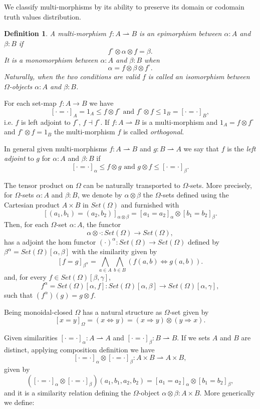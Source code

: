 \documentclass[oribibl]{llncs}
\newtheorem{defn}{Definition}
\begin{document}
We classify multi-morphisms by its ability to preserve its domain or codomain truth values distribution.

\begin{defn}\label{def:isomorphism}
A multi-morphism $f:A\rightharpoonup B$ is an \emph{epimorphism} between $\alpha:A$ and $\beta:B$ if
\[f^\circ\otimes\alpha\otimes f=\beta.\]
It is a \emph{monomorphism} between $\alpha:A$ and $\beta:B$ when
\[\alpha =f\otimes\beta\otimes f^\circ.\]
Naturally, when the two conditions are valid $f$ is called an \emph{isomorphism} between $\Omega$-objects $\alpha:A$ and $\beta:B$.
\end{defn}

For each set-map $f:A\rightarrow B$ we have
\[
[\cdot=\cdot]_A=1_A\leq f\otimes f^\circ \text{ and } f^\circ\otimes f\leq 1_B=[\cdot=\cdot]_B, \]
i.e. $f$ is left adjoint to $f^\circ$, $f\dashv f^\circ$. If $f:A\rightharpoonup B$ is a multi-morphism and $1_A = f\otimes f^\circ$ and $f^\circ\otimes f= 1_B$ the multi-morphism $f$ is called \emph{orthogonal}.

In general given multi-morphisms
$f:A\rightharpoonup B$ and $g:B\rightharpoonup A$ we say that $f$ is the \emph{left adjoint} to $g$ for $\alpha:A$ and $\beta:B$ if
\[
[\cdot=\cdot]_\alpha\leq f\otimes g \text{ and } g\otimes f\leq [\cdot=\cdot]_\beta.\]

The tensor product on $\Omega$ can be naturally transported to $\Omega$-sets. More precisely, for $\Omega$-sets $\alpha:A$ and $\beta:B$, we denote by $\alpha\otimes \beta$ the $\Omega$-sets defined using the Cartesian product $A\times B$ in $Set(\Omega)$ and furnished with
\[
[(a_1,b_1)=(a_2,b_2)]_{\alpha\otimes \beta}=[a_1=a_2]_\alpha\otimes[b_1=b_2]_\beta.
\]
Then, for each $\Omega$-set $\alpha:A$, the functor
\[
\alpha\otimes\cdot:Set(\Omega)\rightarrow Set(\Omega),
\]
has a adjoint the hom functor $(\cdot)^\alpha:Set(\Omega)\rightarrow Set(\Omega)$ defined by  $\beta^\alpha=Set(\Omega)[\alpha,\beta]$ with the similarity given by
\[
[f=g]_{\beta^\alpha}=\bigwedge_{a\in A}\bigwedge_{b\in B}(f(a,b)\Leftrightarrow g(a,b)).
\]
and, for every $f\in Set(\Omega)[\beta,\gamma]$,
\[
f^\alpha = Set(\Omega)[\alpha,f]:Set(\Omega)[\alpha,\beta]\rightarrow Set(\Omega)[\alpha,\gamma],
\] such that $(f^\alpha)(g)=g\otimes f$.

Being monoidal-closed $\Omega$ has a natural structure as $\Omega$-set given by
\[
[x=y]_\Omega=(x\Leftrightarrow y)=(x\Rightarrow y)\otimes(y\Rightarrow x).
\]

Given similarities  $[\cdot=\cdot]_\alpha:A\rightharpoonup A$ and
$[\cdot=\cdot]_\beta:B\rightharpoonup B$. If we sets $A$ and $B$ are distinct,  applying composition definition we have  \[[\cdot=\cdot]_\alpha\otimes[\cdot=\cdot]_\beta:A\times B\rightharpoonup A\times B,\] given by \[([\cdot=\cdot]_\alpha\otimes[\cdot=\cdot]_\beta)(a_1,b_1,a_2,b_2)=[a_1=a_2]_\alpha\otimes[b_1=b_2]_\beta,\] and it is a similarity relation defining the $\Omega$-object  $\alpha\otimes\beta:A\times B$. More generically we define:
\end{document}
